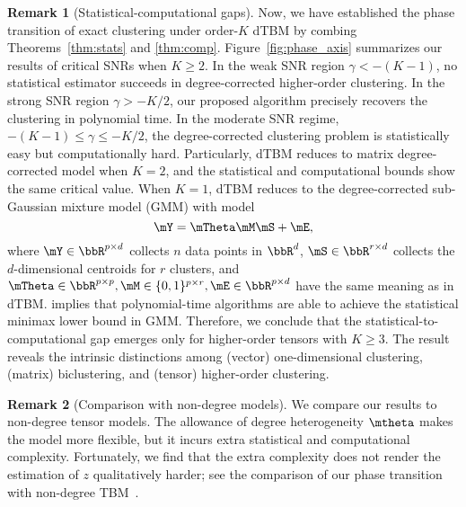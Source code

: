 \documentclass[lettersize,onecolumn,journal]{IEEEtran}
\theoremstyle{definition}
\theoremstyle{definition}
\newtheorem{rmk}{Remark}
\begin{document}
\begin{rmk}[Statistical-computational gaps]
Now, we have established the phase transition of exact clustering under order-$K$ dTBM by combing Theorems~\ref{thm:stats} and \ref{thm:comp}. Figure~\ref{fig:phase_axis} summarizes our results of critical SNRs when $K \geq 2$. In the weak SNR region $\gamma < -(K-1)$, no statistical estimator succeeds in degree-corrected higher-order clustering. In the strong SNR region $\gamma  > -K/2$, our proposed algorithm precisely recovers the clustering in polynomial time. In the moderate SNR regime, $-(K-1)\leq \gamma \leq -K/2$, the degree-corrected clustering problem is statistically easy but computationally hard. Particularly, dTBM reduces to matrix degree-corrected model when $K =2$, and the statistical and computational bounds show the same critical value. When $K =1$, dTBM reduces to the degree-corrected sub-Gaussian mixture model (GMM) with model
\begin{equation}
    \mY = \mTheta \mM \mS + \mE,
\end{equation}
where $\mY \in \bbR^{p \times d}$ collects $n$ data points in $\bbR^d$, $\mS \in \bbR^{r \times d}$ collects the $d$-dimensional centroids for $r$ clusters, and $\mTheta \in \bbR^{p \times p}, \mM \in \{0,1\}^{p \times r}, \mE \in \bbR^{p \times d}$ have the same meaning as in dTBM. \cite{lu2016statistical} implies that polynomial-time algorithms are able to achieve the statistical minimax lower bound in GMM. Therefore, we conclude that the statistical-to-computational gap emerges only for higher-order tensors with $K \geq 3$. The result reveals the intrinsic distinctions among (vector) one-dimensional clustering, (matrix) biclustering, and (tensor) higher-order clustering. 
\end{rmk}


\begin{rmk}[Comparison with non-degree models]
We compare our results to non-degree tensor models. The allowance of degree heterogeneity $\mtheta$ makes the model more flexible, but it incurs extra statistical and computational complexity. Fortunately, we find that the extra complexity does not render the estimation of $z$ qualitatively harder; see the comparison of our phase transition with non-degree TBM~\citep{han2020exact}. 
\end{rmk}
\end{document}
